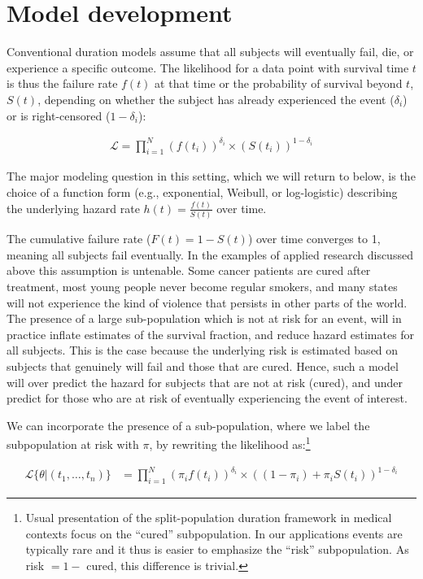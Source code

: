 \documentclass[12pt,onesided]{amsart}
\begin{document}
\section{Model development}

Conventional duration models assume that all subjects will eventually
fail, die, or experience a specific outcome. The likelihood for a data
point with survival time \(t\) is thus the failure rate \(f(t)\) at that
time or the probability of survival beyond \(t\), \(S(t)\), depending on
whether the subject has already experienced the event (\(\delta_i\)) or
is right-censored (\(1-\delta_i\)):

\begin{eqnarray}
\mathcal{L} = \prod_{i=1}^N  \left( f(t_i)\right)^{\delta_i} \times \left( S(t_i) \right)^{1-\delta_i}
\end{eqnarray}

The major modeling question in this setting, which we will return to
below, is the choice of a function form (e.g., exponential, Weibull, or
log-logistic) describing the underlying hazard rate
\(h(t) = \frac{f(t)}{S(t)}\) over time.

The cumulative failure rate (\(F(t) = 1 - S(t)\)) over time converges to
1, meaning all subjects fail eventually. In the examples of applied
research discussed above this assumption is untenable. Some cancer
patients are cured after treatment, most young people never become
regular smokers, and many states will not experience the kind of
violence that persists in other parts of the world. The presence of a
large sub-population which is not at risk for an event, will in practice
inflate estimates of the survival fraction, and reduce hazard estimates
for all subjects. This is the case because the underlying risk is
estimated based on subjects that genuinely will fail and those that are
cured. Hence, such a model will over predict the hazard for subjects
that are not at risk (cured), and under predict for those who are at
risk of eventually experiencing the event of interest.

We can incorporate the presence of a sub-population, where we label the
subpopulation at risk with \(\pi\), by rewriting the likelihood
as:\footnote{Usual presentation of the split-population duration framework in medical contexts focus on the ``cured'' subpopulation. In our applications events are typically rare and it thus is easier to emphasize the ``risk'' subpopulation. As risk $= 1 - $ cured, this difference is trivial.}

\begin{align}
\mathcal{L}\{\theta|(t_{1}, \dots, t_{n})\} &= \prod_{i=1}^{N} \left(\pi_i f(t_i)\right)^{\delta_i} \times  \left((1-\pi_i) + \pi_i S(t_i)\right)^{1-\delta_i}
\end{align}
\end{document}
